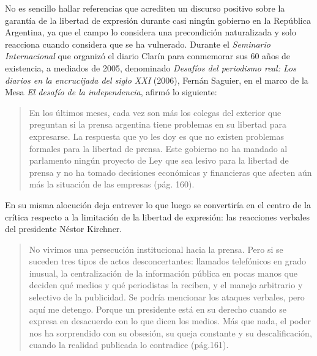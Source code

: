 {No es sencillo hallar referencias que acrediten un discurso positivo sobre la garantía de la libertad de expresión durante casi ningún gobierno en la República Argentina, ya que el campo lo considera una precondición naturalizada y solo reacciona cuando considera que se ha vulnerado. Durante el \emph{Seminario Internacional} que organizó el diario Clarín para conmemorar sus 60 años de existencia, a mediados de 2005, denominado \emph{Desafíos del periodismo real: Los diarios en la encrucijada del siglo XXI} (2006), Fernán Saguier, en el marco de la Mesa \emph{El desafío de la independencia}, afirmó lo siguiente:

\begin{quote}
En los últimos meses, cada vez son más los colegas del exterior que preguntan si la prensa argentina tiene problemas en su libertad para expresarse. La respuesta que yo les doy es que no existen problemas formales para la libertad de prensa. Este gobierno no ha mandado al parlamento ningún proyecto de Ley que sea lesivo para la libertad de prensa y no ha tomado decisiones económicas y financieras que afecten aún más la situación de las empresas (pág. 160).
\end{quote}

En su misma alocución deja entrever lo que luego se convertiría en el centro de la crítica respecto a la limitación de la libertad de expresión: las reacciones verbales del presidente Néstor Kirchner.

\begin{quote}
No vivimos una persecución institucional hacia la prensa. Pero si se suceden tres tipos de actos desconcertantes: llamados telefónicos en grado inusual, la centralización de la información pública en pocas manos que deciden qué medios y qué periodistas la reciben, y el manejo arbitrario y selectivo de la publicidad. Se podría mencionar los ataques verbales, pero aquí me detengo. Porque un presidente está en su derecho cuando se expresa en desacuerdo con lo que dicen los medios. Más que nada, el poder nos ha sorprendido con su obsesión, su queja constante y su descalificación, cuando la realidad publicada lo contradice (pág.161).
\end{quote}

}
